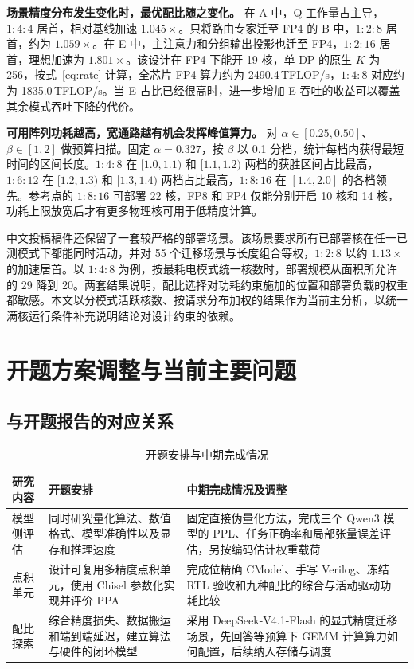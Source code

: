 \documentclass[10.5pt,compsoc,UTF8]{CjC}
\newcommand{\ratio}[3]{\ensuremath{#1\!:\!#2\!:\!#3}}
\begin{document}
\textbf{场景精度分布发生变化时，最优配比随之变化。}
在 A 中，Q 工作量占主导，\ratio{1}{4}{4} 居首，相对基线加速 $1.045\times$。只将路由专家迁至 FP4 的 B 中，\ratio{1}{2}{8} 居首，约为 $1.059\times$。在 E 中，主注意力和分组输出投影也迁至 FP4，\ratio{1}{2}{16} 居首，理想加速为 $1.801\times$。该设计在 FP4 下能开 19 核，单 DP 的原生 $K$ 为 256，按式~\eqref{eq:rate} 计算，全芯片 FP4 算力约为 2490.4\,TFLOP/s，\ratio{1}{4}{8} 对应约为 1835.0\,TFLOP/s。当 E 占比已经很高时，进一步增加 E 吞吐的收益可以覆盖其余模式吞吐下降的代价。

\textbf{可用阵列功耗越高，宽通路越有机会发挥峰值算力。}
对 $\alpha\in[0.25,0.50]$、$\beta\in[1,2]$ 做预算扫描。固定 $\alpha=0.327$，按 $\beta$ 以 0.1 分档，统计每档内获得最短时间的区间长度。\ratio{1}{4}{8} 在 $[1.0,1.1)$ 和 $[1.1,1.2)$ 两档的获胜区间占比最高，\ratio{1}{6}{12} 在 $[1.2,1.3)$ 和 $[1.3,1.4)$ 两档占比最高，\ratio{1}{8}{16} 在 $[1.4,2.0]$ 的各档领先。参考点的 \ratio{1}{8}{16} 可部署 22 核，FP8 和 FP4 仅能分别开启 10 核和 14 核，功耗上限放宽后才有更多物理核可用于低精度计算。

中文投稿稿件还保留了一套较严格的部署场景。该场景要求所有已部署核在任一已测模式下都能同时活动，并对 55 个迁移场景与长度组合等权，\ratio{1}{2}{8} 以约 $1.13\times$ 的加速居首。以 \ratio{1}{4}{8} 为例，按最耗电模式统一核数时，部署规模从面积所允许的 29 降到 20。两套结果说明，配比选择对功耗约束施加的位置和部署负载的权重都敏感。本文以分模式活跃核数、按请求分布加权的结果作为当前主分析，以统一满核运行条件补充说明结论对设计约束的依赖。

\section{开题方案调整与当前主要问题}

\subsection{与开题报告的对应关系}

\begin{table}[htbp]
\centering
\caption{开题安排与中期完成情况}
\label{tab:progress}
\begin{tabularx}{\linewidth}{@{}p{2.45cm}YY@{}}
\toprule
研究内容 & 开题安排 & 中期完成情况及调整 \\
\midrule
模型侧评估 & 同时研究量化算法、数值格式、模型准确性以及显存和推理速度 & 固定直接伪量化方法，完成三个 Qwen3 模型的 PPL、任务正确率和局部张量误差评估，另按编码估计权重载荷 \\
点积单元 & 设计可复用多精度点积单元，使用 Chisel 参数化实现并评价 PPA & 完成位精确 CModel、手写 Verilog、冻结 RTL 验收和九种配比的综合与活动驱动功耗比较 \\
配比探索 & 综合精度损失、数据搬运和端到端延迟，建立算法与硬件的闭环模型 & 采用 DeepSeek-V4.1-Flash 的显式精度迁移场景，先回答等预算下 GEMM 计算算力如何配置，后续纳入存储与调度 \\
\bottomrule
\end{tabularx}
\end{table}
\end{document}
